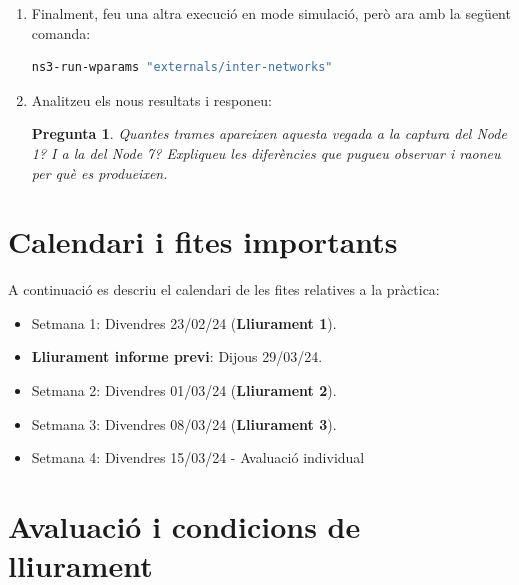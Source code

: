 \documentclass[12pt,a4paper]{article}
\newcounter{exercises}
\newtheorem{exer}[exercises]{Pregunta}
\begin{document}
\begin{enumerate}
\item Finalment, feu una altra execució en mode simulació, però ara amb la següent comanda:
\begin{lstlisting}[language=bash]
   ns3-run-wparams "externals/inter-networks"
\end{lstlisting}
\item Analitzeu els nous resultats i responeu:
\begin{exer} Quantes trames apareixen aquesta vegada a la captura del Node 1? I a la del Node 7? Expliqueu les diferències que pugueu observar i raoneu per què es produeixen.\end{exer}

\end{enumerate}




\section{Calendari i fites importants}

A continuació es descriu el calendari de les fites relatives a la pràctica:
\begin{itemize}
    
    \item Setmana 1: Divendres 23/02/24 (\textbf{Lliurament 1}).
    \item \textbf{Lliurament informe previ}: Dijous 29/03/24.
    \item Setmana 2: Divendres 01/03/24 (\textbf{Lliurament 2}).
    \item Setmana 3: Divendres 08/03/24 (\textbf{Lliurament 3}).
    \item Setmana 4: Divendres 15/03/24  - Avaluació individual
\end{itemize}

\section{Avaluació i condicions de lliurament}
\end{document}
